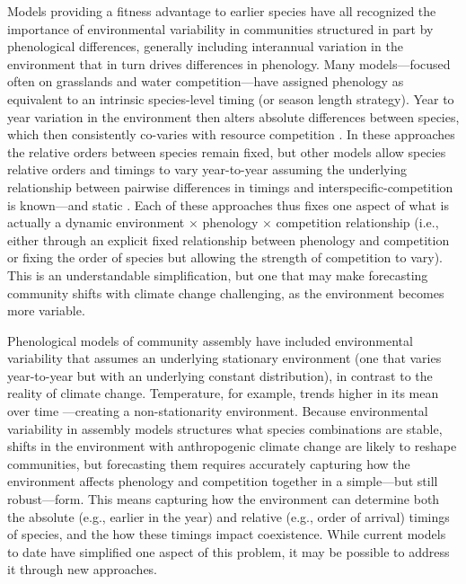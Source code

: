 \documentclass{article}[12pt]
\begin{document}
Models providing a fitness advantage to earlier species have all recognized the importance of environmental variability in communities structured in part by phenological differences, generally including interannual variation in the environment that in turn drives differences in phenology. Many models---focused often on grasslands and water competition---have assigned phenology as equivalent to an intrinsic species-level timing (or season length strategy).  Year to year variation in the environment then alters absolute differences between species, which then consistently co-varies with resource competition \citep{godoy2014,levine2022competition}. In these approaches the relative orders between species remain fixed, but other models allow species relative orders and timings to vary year-to-year assuming the underlying relationship between pairwise differences in timings and interspecific-competition is known---and static \citep{volkerisaj}. %
Each of these approaches thus fixes one aspect of what is actually a dynamic environment $\times$ phenology $\times$ competition relationship (i.e., either through an explicit fixed relationship between phenology and competition or fixing the order of species but allowing the strength of competition to vary). This is an understandable simplification, but one that may make forecasting community shifts with climate change challenging, as the environment becomes more variable.  

Phenological models of community assembly have included environmental variability \citep{volkerisaj,levine2022competition} that assumes an underlying stationary environment (one that varies year-to-year but with an underlying constant distribution), in contrast to the reality of climate change. Temperature, for example, trends higher in its mean over time \citep[with potential changes to the variance,][]{ipcc2021}---creating a non-stationarity environment. Because environmental variability in assembly models structures what species combinations are stable, shifts in the environment with anthropogenic climate change are likely to reshape communities, but forecasting them requires accurately capturing how the environment affects phenology and competition together in a simple---but still robust---form. This means capturing how  the environment can determine both the absolute (e.g., earlier in the year) and relative (e.g., order of arrival) timings of species, and the how these timings impact coexistence. While current models to date have simplified one aspect of this problem, it may be possible to address it through new approaches. 
\end{document}
